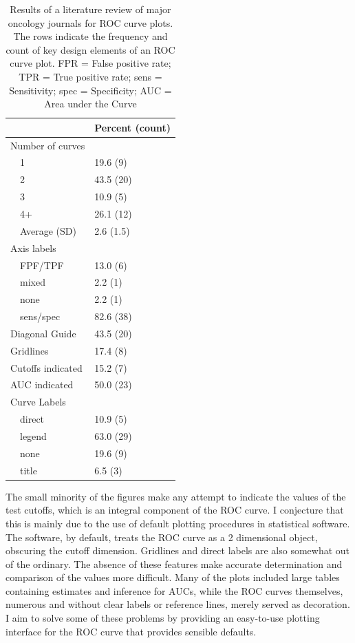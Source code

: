 \documentclass[codesnippet]{jss}
\begin{document}
\begin{table}[ht]
\centering
\begin{tabular}{ll}
  \hline
 & Percent (count) \\ 
  \hline
Number of curves &  \\ 
  $\quad$1 & 19.6 (9) \\ 
  $\quad$2 & 43.5 (20) \\ 
  $\quad$3 & 10.9 (5) \\ 
  $\quad$4+ & 26.1 (12) \\ 
  $\quad$Average (SD) & 2.6 (1.5) \\ 
  Axis labels &  \\ 
  $\quad$FPF/TPF & 13.0 (6) \\ 
  $\quad$mixed & 2.2 (1) \\ 
  $\quad$none & 2.2 (1) \\ 
  $\quad$sens/spec & 82.6 (38) \\ 
  Diagonal Guide & 43.5 (20) \\ 
  Gridlines & 17.4 (8) \\ 
  Cutoffs indicated & 15.2 (7) \\ 
  AUC indicated & 50.0 (23) \\ 
  Curve Labels &  \\ 
  $\quad$direct & 10.9 (5) \\ 
  $\quad$legend & 63.0 (29) \\ 
  $\quad$none & 19.6 (9) \\ 
  $\quad$title & 6.5 (3) \\ 
   \hline
\end{tabular}
\caption{Results of a literature review of major oncology journals for ROC curve plots. The rows indicate the frequency and count of key design elements of an ROC curve plot. FPR = False positive rate; TPR = True positive rate; sens = Sensitivity; spec = Specificity; AUC = Area under the Curve} 
\label{table1}
\end{table}

The small minority of the figures make any attempt to indicate the
values of the test cutoffs, which is an integral component of the ROC
curve. I conjecture that this is mainly due to the use of default
plotting procedures in statistical software. The software, by default,
treats the ROC curve as a 2 dimensional object, obscuring the cutoff
dimension. Gridlines and direct labels are also somewhat out of the
ordinary. The absence of these features make accurate determination and
comparison of the values more difficult. Many of the plots included
large tables containing estimates and inference for AUCs, while the ROC
curves themselves, numerous and without clear labels or reference lines,
merely served as decoration. I aim to solve some of these problems by
providing an easy-to-use plotting interface for the ROC curve that
provides sensible defaults.
\end{document}
